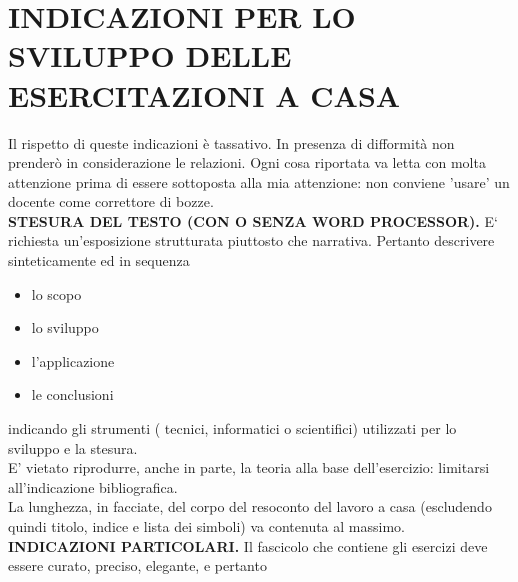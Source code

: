 \newpage
\enlargethispage{\baselineskip}
\section*{\normalsize INDICAZIONI PER LO SVILUPPO DELLE ESERCITAZIONI A CASA}

Il rispetto di queste indicazioni è tassativo. In presenza di difformità non prenderò in considerazione le relazioni. Ogni cosa riportata va letta con molta attenzione prima di essere sottoposta alla mia attenzione: non conviene 'usare' un docente come correttore di bozze.\\
{\bfseries  STESURA DEL TESTO (CON O SENZA WORD PROCESSOR).} E` richiesta un'esposizione strutturata piuttosto che narrativa.
Pertanto descrivere sinteticamente ed in sequenza
\begin{itemize}
\item{ lo scopo}
\item{ lo sviluppo}
\item{ l'applicazione}
\item{ le conclusioni}
\end{itemize}
indicando gli strumenti ( tecnici, informatici o scientifici) utilizzati per lo sviluppo e la stesura.\\
E' vietato riprodurre, anche in parte, la teoria alla base dell'esercizio: limitarsi all'indicazione bibliografica.\\
La lunghezza, in facciate, del corpo del resoconto del lavoro a casa (escludendo quindi titolo, indice e lista dei simboli) va contenuta al massimo.\\
{\bfseries INDICAZIONI PARTICOLARI.} Il fascicolo che contiene gli esercizi deve essere curato, preciso, elegante, e pertanto
